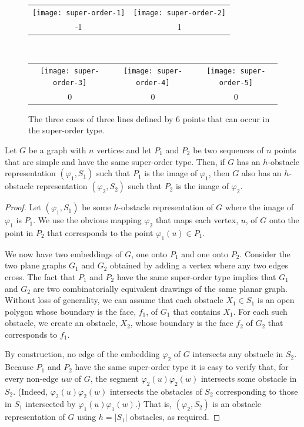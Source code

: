 \documentclass{patmorin}
\begin{document}
\begin{figure}
  \begin{center}
    \begin{tabular}{cc}
       \texttt{[image: super-order-1]} &
       \texttt{[image: super-order-2]} \\ 
       -1 & 1 \\
    \end{tabular}\\[4ex]
    \begin{tabular}{ccc}
       \texttt{[image: super-order-3]} &
       \texttt{[image: super-order-4]} &
       \texttt{[image: super-order-5]} \\
       0 & 0 & 0
    \end{tabular}
  \end{center}
  \caption{The three cases of three lines defined by 6 points that can
      occur in the super-order type.}
\end{figure}

\begin{lem}
  Let $G$ be a graph with $n$ vertices and let $P_1$ and $P_2$ be two
  sequences of $n$ points that are simple and have the same super-order
  type.  Then, if $G$ has an $h$-obstacle representation $(\varphi_1,S_1)$
  such that $P_1$ is the image of $\varphi_1$, then $G$ also has an
  $h$-obstacle representation $(\varphi_2,S_2)$ such that $P_2$ is the
  image of $\varphi_2$.
\end{lem}

\begin{proof}
  Let $(\varphi_1,S_1)$ be some $h$-obstacle representation of $G$
  where the image of $\varphi_1$ is $P_1$.
  We use the obvious mapping $\varphi_2$ that maps each vertex,
  $u$, of $G$ onto the point in $P_2$ that corresponds to the point
  $\varphi_1(u)\in P_1$.

  We now have two embeddings of $G$, one onto $P_1$ and one onto $P_2$.
  Consider the two plane graphs $G_1$ and $G_2$ obtained by adding a
  vertex where any two edges cross.  The fact that $P_1$
  and $P_2$ have the same super-order type implies that $G_1$ and $G_2$
  are two combinatorially equivalent drawings of the same planar graph.
  Without loss of generality, we can assume that each obstacle $X_1\in
  S_1$ is an open polygon whose boundary is the face, $f_1$, of $G_1$ that
  contains $X_1$.  For each such obstacle, we create an obstacle, $X_2$,
  whose boundary is the face $f_2$ of $G_2$ that corresponds to $f_1$.

  By construction, no edge of the embedding $\varphi_2$ of $G$
  intersects any obstacle in $S_2$.  Because $P_1$ and $P_2$ have the
  same super-order type it is easy to verify that, for every non-edge
  $uw$ of $G$, the segment $\varphi_2(u)\varphi_2(w)$ intersects some
  obstacle in $S_2$. (Indeed, $\varphi_2(u)\varphi_2(w)$ intersects
  the obstacles of $S_2$ corresponding to those in $S_1$ intersected
  by $\varphi_1(u)\varphi_1(w)$.)  That is, $(\varphi_2,S_2)$ is an
  obstacle representation of $G$ using $h=|S_1|$ obstacles, as required.
\end{proof}
\end{document}
